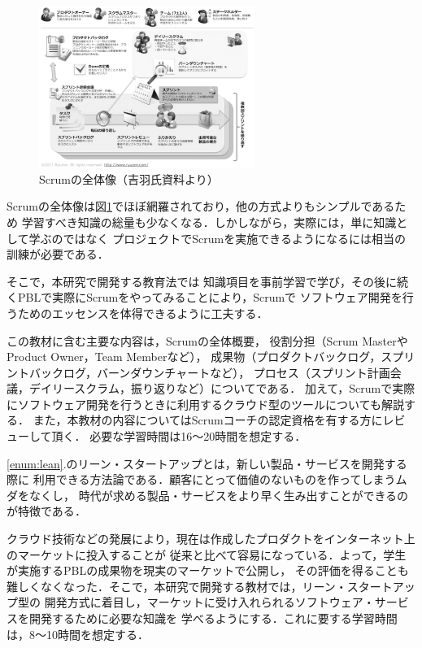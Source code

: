 \documentclass[11pt,a4paper,twoside]{jarticle}
\newcommand{\研究種別}{A}	%
\newcommand{\研究課題名}{コ・クリエイティブなソフトウェア開発者を育成するPBL型教育}
\newcommand{\研究機関名}{産業技術大学院大学}
\newcommand{\研究代表者氏名}{中鉢　欣秀}
\newcommand{\研究代表者氏名ふりがな}{ちゅうばち　よしひで}
\newcommand{\本応募effort}{\KLEffort{18}}	%
\newcommand{\研究期間の最終元号年度}{27}	%
\begin{document}
{         \begin{figure}
         	\begin{center}
		         \includegraphics[width=7cm]{figs/scrum.eps}
		         \caption{Scrumの全体像（吉羽氏資料より）}
		         \label{fig:scrum}
	         \end{center}
         \end{figure}

	Scrumの全体像は図\ref{fig:scrum}でほぼ網羅されており，他の方式よりもシンプルであるため
	学習すべき知識の総量も少なくなる．しかしながら，実際には，単に知識として学ぶのではなく
	プロジェクトでScrumを実施できるようになるには相当の訓練が必要である．
	
	そこで，本研究で開発する教育法では
	知識項目を事前学習で学び，その後に続くPBLで実際にScrumをやってみることにより，Scrumで
	ソフトウェア開発を行うためのエッセンスを体得できるように工夫する．
	
	この教材に含む主要な内容は，Scrumの全体概要，
	役割分担（Scrum MasterやProduct Owner，Team Memberなど），
	成果物（プロダクトバックログ，スプリントバックログ，バーンダウンチャートなど），
	プロセス（スプリント計画会議，デイリースクラム，振り返りなど）についてである．
	加えて，Scrumで実際にソフトウェア開発を行うときに利用するクラウド型のツールについても解説する．
	また，本教材の内容についてはScrumコーチの認定資格を有する方にレビューして頂く．
	必要な学習時間は16～20時間を想定する．
	

	\ref{enum:lean}.のリーン・スタートアップとは，新しい製品・サービスを開発する際に
	利用できる方法論である．顧客にとって価値のないものを作ってしまうムダをなくし，
	時代が求める製品・サービスをより早く生み出すことができるのが特徴である\cite{lean-startup}．
	
	クラウド技術などの発展により，現在は作成したプロダクトをインターネット上のマーケットに投入することが
	従来と比べて容易になっている．よって，学生が実施するPBLの成果物を現実のマーケットで公開し，
	その評価を得ることも難しくなくなった．そこで，本研究で開発する教材では，リーン・スタートアップ型の
	開発方式に着目し，マーケットに受け入れられるソフトウェア・サービスを開発するために必要な知識を
	学べるようにする．これに要する学習時間は，8～10時間を想定する．

}
\end{document}
